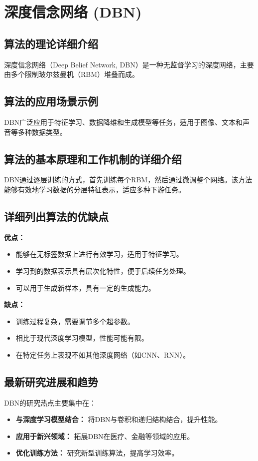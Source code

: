 \section{深度信念网络 (DBN)}
\subsection*{算法的理论详细介绍}
深度信念网络（Deep Belief Network, DBN）是一种无监督学习的深度网络，主要由多个限制玻尔兹曼机（RBM）堆叠而成。

\subsection*{算法的应用场景示例}
DBN广泛应用于特征学习、数据降维和生成模型等任务，适用于图像、文本和声音等多种数据类型。

\subsection*{算法的基本原理和工作机制的详细介绍}
DBN通过逐层训练的方式，首先训练每个RBM，然后通过微调整个网络。该方法能够有效地学习数据的分层特征表示，适应多种下游任务。

\subsection*{详细列出算法的优缺点}
\textbf{优点：}
\begin{itemize}
    \item 能够在无标签数据上进行有效学习，适用于特征学习。
    \item 学习到的数据表示具有层次化特性，便于后续任务处理。
    \item 可以用于生成新样本，具有一定的生成能力。
\end{itemize}

\textbf{缺点：}
\begin{itemize}
    \item 训练过程复杂，需要调节多个超参数。
    \item 相比于现代深度学习模型，性能可能有限。
    \item 在特定任务上表现不如其他深度网络（如CNN、RNN）。
\end{itemize}

\subsection*{最新研究进展和趋势}
DBN的研究热点主要集中在：
\begin{itemize}
    \item \textbf{与深度学习模型结合：} 将DBN与卷积和递归结构结合，提升性能。
    \item \textbf{应用于新兴领域：} 拓展DBN在医疗、金融等领域的应用。
    \item \textbf{优化训练方法：} 研究新型训练算法，提高学习效率。
\end{itemize}
